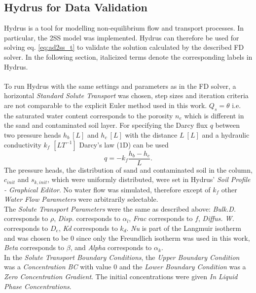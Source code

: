 \subsection{Hydrus for Data Validation}
Hydrus \cite{Simunek2008May} is a tool for modelling non-equilibrium flow and transport processes. In particular, the 2SS model was implemented. Hydrus can therefore be used for solving eq. \ref{eq:ad2ss_t} to validate the solution calculated by the described FD solver. In the following section, italicized terms denote the corresponding labels in Hydrus.\\
\\
To run Hydrus with the same settings and parameters as in the FD solver, a horizontal \textit{Standard Solute Transport} was chosen, step sizes and iteration criteria are not comparable to the explicit Euler method used in this work. $Q_s = \theta$ i.e. the saturated water content corresponds to the porosity $n_e$ which is different in the sand and contaminated soil layer. For specifying the Darcy flux $q$ between two pressure heads $h_b\:[L]$ and $h_c\:[L]$ with the distance $L\:[L]$ and a hydraulic conductivity $k_f$ $[LT^{-1}]$ Darcy's law (1D) can be used
\begin{equation}
    q = -k_f\frac{h_b-h_c}{L}.
\end{equation}
The pressure heads, the distribution of sand and contaminated soil in the column, $c_{init}$ and $s_{k, init}$, which were uniformly distributed, were set in Hydrus' \textit{Soil Profile - Graphical Editor}. No water flow was simulated, therefore except of $k_f$ other \textit{Water Flow Parameters} were arbitrarily selectable.\\
The \textit{Solute Transport Parameters} were the same as described above: \textit{Bulk.D.} corresponds to $\rho$, \textit{Disp.} corresponds to $\alpha_l$, \textit{Frac} corresponds to $f$, \textit{Diffus. W.} corresponds to $D_e$, \textit{Kd} corresponds to $k_d$. \textit{Nu} is part of the Langmuir isotherm and was chosen to be 0 since only the Freundlich isotherm was used in this work, \textit{Beta} corresponds to $\beta$, and \textit{Alpha} corresponds to $\alpha_k$.\\
In the \textit{Solute Transport Boundary Conditions}, the \textit{Upper Boundary Condition} was a \textit{Concentration BC} with value 0 and the \textit{Lower Boundary Condition} was a \textit{Zero Concentration Gradient}. The initial concentrations were given \textit{In Liquid Phase Concentrations}.\\
\\
